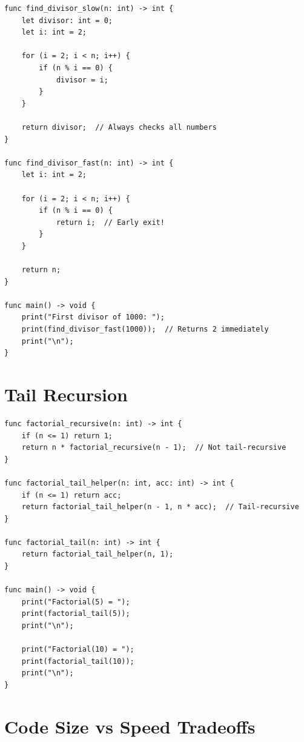 \documentclass[12pt,a4paper,oneside]{book}
\begin{document}
\begin{lstlisting}[style=algo, caption={Avoid Unnecessary Work}]
func find_divisor_slow(n: int) -> int {
    let divisor: int = 0;
    let i: int = 2;
    
    for (i = 2; i < n; i++) {
        if (n % i == 0) {
            divisor = i;
        }
    }
    
    return divisor;  // Always checks all numbers
}

func find_divisor_fast(n: int) -> int {
    let i: int = 2;
    
    for (i = 2; i < n; i++) {
        if (n % i == 0) {
            return i;  // Early exit!
        }
    }
    
    return n;
}

func main() -> void {
    print("First divisor of 1000: ");
    print(find_divisor_fast(1000));  // Returns 2 immediately
    print("\n");
}
\end{lstlisting}

\section{Tail Recursion}

\begin{lstlisting}[style=algo, caption={Tail-Recursive Factorial}]
func factorial_recursive(n: int) -> int {
    if (n <= 1) return 1;
    return n * factorial_recursive(n - 1);  // Not tail-recursive
}

func factorial_tail_helper(n: int, acc: int) -> int {
    if (n <= 1) return acc;
    return factorial_tail_helper(n - 1, n * acc);  // Tail-recursive
}

func factorial_tail(n: int) -> int {
    return factorial_tail_helper(n, 1);
}

func main() -> void {
    print("Factorial(5) = ");
    print(factorial_tail(5));
    print("\n");
    
    print("Factorial(10) = ");
    print(factorial_tail(10));
    print("\n");
}
\end{lstlisting}

\section{Code Size vs Speed Tradeoffs}
\end{document}
